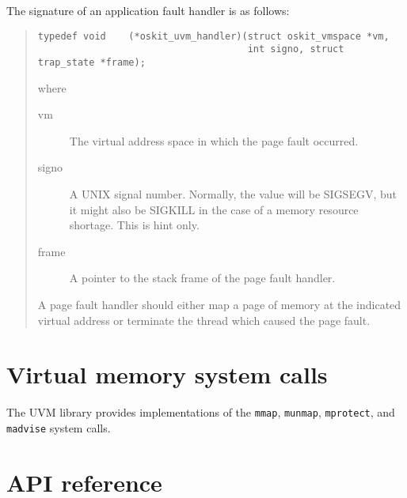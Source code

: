 The signature of an application fault handler is as follows:
\begin{quote}
\begin{verbatim}
typedef void    (*oskit_uvm_handler)(struct oskit_vmspace *vm,
                                     int signo, struct trap_state *frame);
\end{verbatim}
where 
\begin{description}
        \item[vm]
                The virtual address space in which the page fault occurred.
        \item[signo]
                A UNIX signal number.  Normally, the value will be
                SIGSEGV, but it might also be SIGKILL in the case of
		a memory resource shortage.  This is hint only.
        \item[frame]
    	        A pointer to the stack frame of the page fault handler.
\end{description}

A page fault handler should either map a page of memory at the indicated
virtual address or terminate the thread which caused the page fault.
\end{quote}

\section{Virtual memory system calls}

The UVM library provides implementations of the \texttt{mmap},
\texttt{munmap}, \texttt{mprotect}, and \texttt{madvise} system calls.

\section{API reference}

